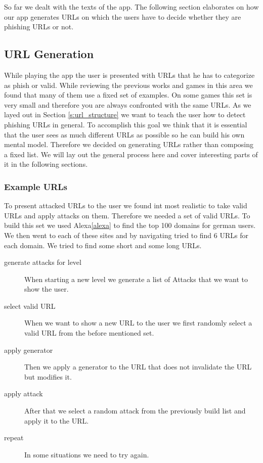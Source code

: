 So far we dealt with the texts of the app. 
The following section elaborates on how our app generates URLs on which the users have to decide whether they are phishing URLs or not.


\subsection{URL Generation}
While playing the app the user is presented with URLs that he has to categorize as phish or valid.
While reviewing the previous works and games in this area we found that many of them use a fixed set of examples.
On some games this set is very small and therefore you are always confronted with the same URLs.
As we layed out in Section \ref{s:url_structure} we want to teach the user how to detect phishing URLs in general.
To accomplish this goal we think that it is essential that the user sees as much different URLs as possible so he can build his own mental model.
Therefore we decided on generating URLs rather than composing a fixed list.
We will lay out the general process here and cover interesting parts of it in the following sections.
\subsubsection{Example URLs}
To present attacked URLs to the user we found int most realistic to take valid URLs and apply attacks on them.
Therefore we needed a set of valid URLs.
To build this set we used Alexa\ref{alexa} to find the top 100 domains for german users.
We then went to each of these sites and by navigating tried to find 6 URLs for each domain.
We tried to find some short and some long URLs.
\begin{description}
\item[generate attacks for level]When starting a new level we generate a list of Attacks that we want to show the user.
\item[select valid URL]When we want to show a new URL to the user we first randomly select a valid URL from the before mentioned set.
\item[apply generator]Then we apply a generator to the URL that does not invalidate the URL but modifies it.
\item[apply attack]After that we select a random attack from the previously build list and apply it to the URL.
\item[repeat]In some situations we need to try again.
\end{description}
